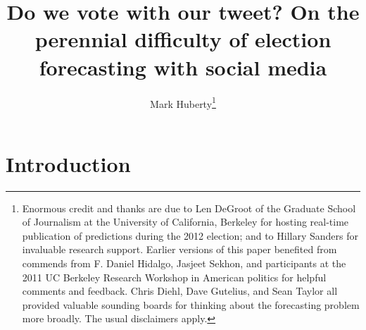 \documentclass{article}
\begin{document}
\title{Do we vote with our tweet? On the perennial difficulty of election
forecasting with social media}
\author{
Mark Huberty\thanks{Enormous credit and thanks are due to Len DeGroot of the
  Graduate School of Journalism at the University of California,
  Berkeley for hosting real-time publication of predictions during the
2012 election; and to Hillary Sanders for invaluable research
support. Earlier versions of this paper benefited from commends from F. Daniel Hidalgo, Jasjeet Sekhon, and
participants at the 2011 UC Berkeley Research Workshop in American
politics for helpful comments and feedback. Chris Diehl, Dave
Gutelius, and Sean Taylor all provided valuable sounding boards for
thinking about the forecasting problem more broadly. The usual disclaimers apply.}
}

\maketitle
\begin{abstract}

\end{abstract}

\doublespacing
\section{Introduction}
\label{sec:introduction}

\end{document}
